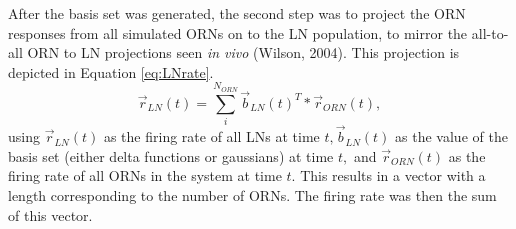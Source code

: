 \documentclass[a4paper,12pt,twoside]{article}
\begin{document}
After the basis set was generated, the second step was to project the ORN responses from all simulated ORNs on to the LN population, to mirror the all-to-all ORN to LN projections seen \textit{in vivo} (Wilson, 2004).  This projection is depicted in Equation \ref{eq:LNrate}.
\begin{equation}
\vec{r}_{LN}(t) = \sum\limits_{i} ^{N_{ORN}}{\vec{b}_{LN}(t)^T * \vec{r}_{ORN}(t)},
\label{eq:LNrate}
\end{equation}
using $\vec{r}_{LN}(t)$ as the firing rate of all LNs at time $t, \vec{b}_{LN}(t)$ as the value of the basis set (either delta functions or gaussians) at time $t,$ and $\vec{r}_{ORN}(t)$ as the firing rate of all ORNs in the system at time $t.$  This results in a vector with a length corresponding to the number of ORNs.  The firing rate was then the sum of this vector.
\end{document}
